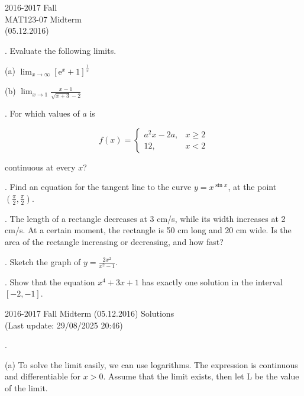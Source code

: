 \documentclass{article}
\begin{document}
\pagestyle{empty}
\large

\begin{center}
2016-2017 Fall \\MAT123-07 Midterm\\(05.12.2016)
\end{center}

. Evaluate the following limits.

\hfill

(a) $\displaystyle \lim_{x \to \infty} [\mathrm{e}^x + 1]^{\frac{1}{x}}$

\hfill

(b) $\displaystyle \lim_{x \to 1} \frac{x-1}{\sqrt{x+3} - 2}$

\hfill

. For which values of $a$ is

\[
f(x) =
\begin{cases}
a^2x - 2a, & x \geq 2 \\
12,  & x < 2
\end{cases}
\]

\noindent continuous at every $x$?

\hfill

. Find an equation for the tangent line to the curve $ y = x^{\sin x}$, at the point $(\frac{\pi}{2}, \frac{\pi}{2})$.

\hfill

. The length of a rectangle decreases at 3 cm/s, while its width increases at 2 cm/s. At a certain moment, the rectangle is 50 cm long and 20 cm wide. Is the area of the rectangle increasing or decreasing, and how fast?

\hfill

. Sketch the graph of $\displaystyle y = \frac{2x^2}{x^2-1}$.

\hfill

. Show that the equation $x^4 + 3x + 1$ has exactly one solution in the interval $[-2, -1]$.

\newpage

\begin{center}
2016-2017 Fall Midterm (05.12.2016) Solutions\\
(Last update: 29/08/2025 20:46)
\end{center}

.

\hfill

\noindent (a) To solve the limit easily, we can use logarithms. The expression is continuous and differentiable for $x > 0$. Assume that the limit exists, then let L be the value of the limit.
\end{document}
